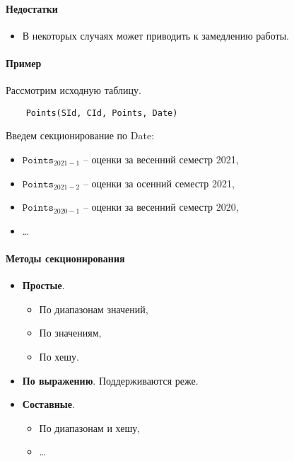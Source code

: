 \paragraph{Недостатки}

\begin{itemize}
	\item В некоторых случаях может приводить к замедлению работы.
\end{itemize}

\paragraph{Пример}

Рассмотрим исходную таблицу.

\begin{lstlisting}
    Points(SId, CId, Points, Date)
\end{lstlisting}

Введем секционирование по Date:

\begin{itemize}
	\item $\texttt{Points}_{2021-1}$ -- оценки за весенний семестр 2021,
	\item $\texttt{Points}_{2021-2}$ -- оценки за осенний семестр 2021,
	\item $\texttt{Points}_{2020-1}$ -- оценки за весенний семестр 2020,
	\item \ldots
\end{itemize}

\paragraph{Методы секционирования}

\begin{itemize}
	\item \textbf{Простые}.
	      \begin{itemize}
		      \item По диапазонам значений,
		      \item По значениям,
		      \item По хешу.
	      \end{itemize}
	\item \textbf{По выражению}. Поддерживаются реже.
	\item \textbf{Составные}.
	      \begin{itemize}
		      \item По диапазонам и хешу,
		      \item \ldots
	      \end{itemize}
\end{itemize}

